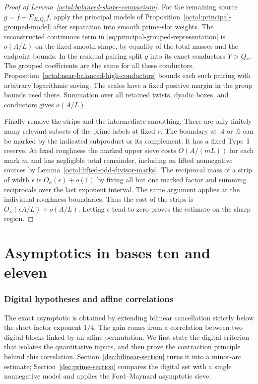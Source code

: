 \documentclass[11pt,a4paper]{article}
\theoremstyle{paperplain}
\numberwithin{equation}{section}
\begin{document}
\begin{proof}[Proof of Lemma~\ref{octal:balanced-shape-comparison}]
For the remaining source $g=f-E_{X,Q_*}f$, apply the principal models
of Proposition~\ref{octal:principal-grouped-model} after separation
into smooth prime-slot weights. The reconstructed continuous term in
\eqref{eq:principal-grouped-representation} is $o(A/L)$ on the fixed
smooth shape, by equality of the total masses and the endpoint bounds.
In the residual pairing split $g$ into its exact conductors $Y>Q_*$.
The grouped coefficients are the same for all these conductors.
Proposition~\ref{octal:near-balanced-high-conductors} bounds each such
pairing with arbitrary logarithmic saving. The scales have a fixed
positive margin in the group bounds used there. Summation over all
retained twists, dyadic boxes, and conductors gives $o(A/L)$.

Finally remove the strips and the intermediate smoothing. There
are only finitely many relevant subsets of the prime labels at fixed
$r$. The boundary at $.4$ or $.6$ can be marked by the indicated
subproduct or its complement. It has a fixed Type~I reserve. At
fixed roughness the marked upper sieve costs $O(A/(mL))$ for each
mark $m$ and has negligible total remainder, including on lifted
nonnegative sources by Lemma~\ref{octal:lifted-odd-divisor-marks}.
The reciprocal mass of a strip of width $\epsilon$ is
$O_\kappa(\epsilon)+o(1)$ by fixing all but one marked factor and
summing reciprocals over the last exponent interval. The same
argument applies at the individual roughness boundaries. Thus the
cost of the strips is $O_\kappa(\epsilon A/L)+o(A/L)$. Letting
$\epsilon$ tend to zero proves the estimate on the sharp region.
\end{proof}

\part{Asymptotics in bases ten and eleven}

\section{Digital hypotheses and affine correlations}
\label{dec:section}

The exact asymptotic is obtained by extending bilinear cancellation
strictly below the short-factor exponent $1/4$. The gain comes from a
correlation between two digital blocks linked by an affine permutation.
We first state the digital criterion that isolates the quantitative inputs,
and then prove the contraction principle behind this correlation.
Section~\ref{dec:bilinear-section} turns it into a minor-arc estimate;
Section~\ref{dec:prime-section} compares the digital set with a single
nonnegative model and applies the Ford--Maynard asymptotic sieve.
\end{document}
